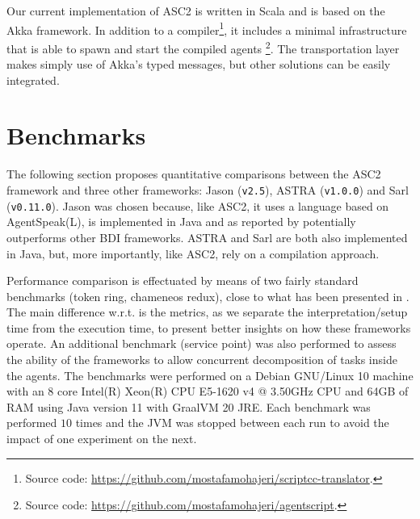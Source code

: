 Our current implementation of ASC2 is written in Scala and is based on the Akka framework. In addition to a compiler\footnote{Source code: 
\url{https://github.com/mostafamohajeri/scriptcc-translator}.}, it includes a minimal infrastructure that is able to spawn and start the compiled agents%
\footnote{Source code: \url{https://github.com/mostafamohajeri/agentscript}.
}. The transportation layer makes simply use of Akka's typed messages, but other solutions can be easily integrated.



\section{Benchmarks}
\label{sec_bench}

The following section proposes quantitative comparisons between the ASC2 framework and three other frameworks: Jason (\verb+v2.5+), ASTRA (\verb+v1.0.0+) and Sarl (\verb+v0.11.0+). Jason \cite{Bordini2005} was chosen because, like ASC2, it uses a language based on AgentSpeak(L), is implemented in Java and as reported by \cite{Cardoso2013} potentially outperforms other BDI frameworks. ASTRA and Sarl are both also implemented in Java, but, more importantly, like ASC2, rely on a compilation approach. %

Performance comparison is effectuated by means of two fairly standard benchmarks (token ring, chameneos redux), close to what has been presented in \cite{Cardoso2013}. The main difference w.r.t. \cite{Cardoso2013} is the metrics, as we separate the interpretation/setup time from the execution time, to present better insights on how these frameworks operate. %
An additional benchmark (service point) was also performed to assess the ability of the frameworks to allow concurrent decomposition of tasks inside the agents. The benchmarks were performed on a {Debian GNU/Linux 10} machine with an 8 core {Intel(R) Xeon(R) CPU E5-1620 v4 @ 3.50GHz} CPU and {64GB} of RAM using Java version {11} with {GraalVM 20} JRE.  Each benchmark was performed $10$ times and the JVM was stopped between each run to avoid the impact of one experiment on the next. %


